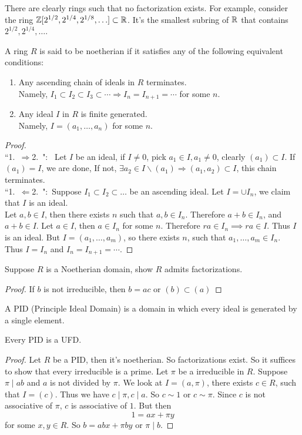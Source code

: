 \begin{remark}
There are clearly rings such that no factorization exists. For example, consider the ring $\mathbb{Z}[2^{1/2},2^{1/4},2^{1/8},\ldots]\subset \mathbb{R}$. It's the smallest subring of $\mathbb{R}$ that contains $2^{1/2},2^{1/4},\ldots$.
\end{remark}
\begin{definition}
A ring $R$ is said to be noetherian if it satisfies any of the following equivalent conditions:
\begin{enumerate}
\item Any ascending chain of ideals in $R$ terminates.\\
Namely, $I_1\subset I_2\subset I_3\subset \cdots\Rightarrow I_n = I_{n+1}=\cdots$ for some $n$.
\item Any ideal $I$ in $R$ is finite generated.\\
Namely, $I=(a_1,\ldots,a_n)$ for some $n$.
\end{enumerate}
\end{definition}
\begin{proof}
\mbox{}\\\mbox{``1.\ $\Rightarrow$2.\ ": } Let $I$ be an ideal, if $I\ne0$, pick $a_1\in I, a_1\neq 0$, clearly $(a_1)\subset I$. 
If $(a_1)=I$, we are done, If not,
$\exists a_2\in I\backslash(a_1)\Rightarrow (a_1,a_2)\subset I $, this chain terminates.\\
\mbox{``1.\ $\Leftarrow$2.\ ": }Suppose $I_1\subset I_2\subset \ldots$ be an ascending ideal. Let $I = \cup I_n$, we claim that $I$ is an ideal.\\
Let $a,b\in I$, then there exists $n$ such that $a,b\in I_n$. Therefore $a+b\in I_n$, and $a+b\in I$. Let $a\in I$, then $a\in I_n$ for some $n$. Therefore $ra\in I_n\implies ra\in I$. Thus $I$ is an ideal. But $I=(a_1,\ldots,a_m)$, so there exists $n$, such that $a_1,\ldots,a_m\in I_n$. Thus $I=I_n$ and $I_n=I_{n+1}=\cdots$.
\end{proof}
\begin{exercise}
Suppose $R$ is a Noetherian domain, show $R$ admits factorizations.
\end{exercise}
\begin{proof}
If $b$ is not irreducible, then $b=ac$ or $(b)\subset(a)$\notcomplete
\end{proof}
\begin{definition}
A PID (Principle Ideal Domain) is a domain in which every ideal is generated by a single element.
\end{definition}
\begin{theorem}
Every PID is a UFD.
\end{theorem}
\begin{proof}
Let $R$ be a PID, then it's noetherian. So factorizations exist. So it suffices to show that every irreducible is a prime. Let $\pi$ be a irreducible in $R$. Suppose $\pi\mid ab$ and $a$ is not divided by $\pi$. We look at $I=(a,\pi)$, there exists $c\in R$, such that $I=(c)$. Thus we have $c\mid \pi, c\mid a$. So $c\sim 1$ or $c\sim \pi$. Since $c$ is not associative of $\pi$, $c$ is associative of $1$. But then $$1=ax+\pi y$$ for some $x,y\in R$. So $b=abx+\pi by$ or $\pi\mid b$.
\end{proof}

